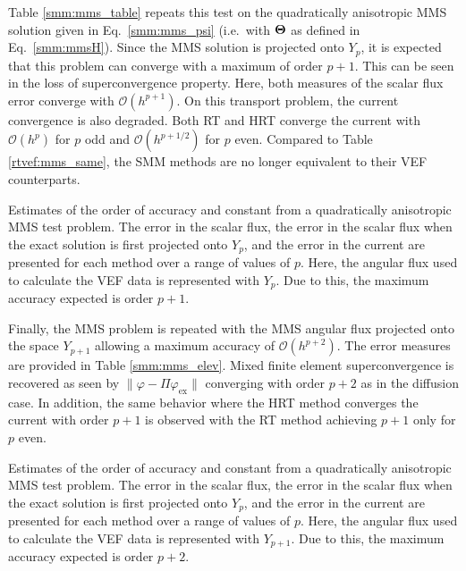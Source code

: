\documentclass[../doc.tex]{subfiles}
\begin{document}
Table \ref{smm:mms_table} repeats this test on the quadratically anisotropic MMS solution given in Eq.~\ref{smm:mms_psi} (i.e.~with $\boldsymbol{\mathrm{\Theta}}$ as defined in Eq.~\ref{smm:mmsH}). Since the MMS solution is projected onto $Y_p$, it is expected that this problem can converge with a maximum of order $p+1$. This can be seen in the loss of superconvergence property. Here, both measures of the scalar flux error converge with $\mathcal{O}(h^{p+1})$. On this transport problem, the current convergence is also degraded. Both RT and HRT converge the current with $\mathcal{O}(h^p)$ for $p$ odd and $\mathcal{O}(h^{p+1/2})$ for $p$ even. Compared to Table \ref{rtvef:mms_same}, the SMM methods are no longer equivalent to their VEF counterparts. 
\begin{table}
\centering
\caption{Estimates of the order of accuracy and constant from a quadratically anisotropic MMS test problem. The error in the scalar flux, the error in the scalar flux when the exact solution is first projected onto $Y_p$, and the error in the current are presented for each method over a range of values of $p$. Here, the angular flux used to calculate the VEF data is represented with $Y_p$. Due to this, the maximum accuracy expected is order $p+1$. }
\label{smm:mms_table}

\end{table}

Finally, the MMS problem is repeated with the MMS angular flux projected onto the space $Y_{p+1}$ allowing a maximum accuracy of $\mathcal{O}(h^{p+2})$. The error measures are provided in Table \ref{smm:mms_elev}. Mixed finite element superconvergence is recovered as seen by $\|\varphi - \Pi \varphi_\text{ex}\|$ converging with order $p+2$ as in the diffusion case. In addition, the same behavior where the HRT method converges the current with order $p+1$ is observed with the RT method achieving $p+1$ only for $p$ even. 
\begin{table}
\centering
\caption{Estimates of the order of accuracy and constant from a quadratically anisotropic MMS test problem. The error in the scalar flux, the error in the scalar flux when the exact solution is first projected onto $Y_p$, and the error in the current are presented for each method over a range of values of $p$. Here, the angular flux used to calculate the VEF data is represented with $Y_{p+1}$. Due to this, the maximum accuracy expected is order $p+2$.}
\label{smm:mms_elev}

\end{table}
\end{document}
